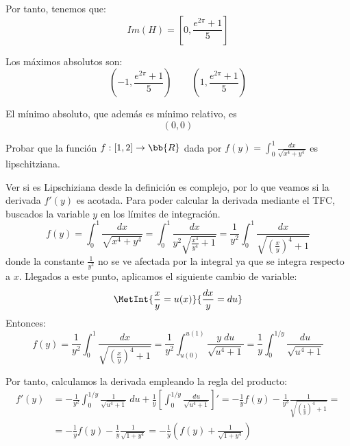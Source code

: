 \begin{ejercicio}
    Por tanto, tenemos que:
    \begin{equation*}
        Im(H) = \left[0,\frac{e^{2\pi} +1}{5}\right]
    \end{equation*}

    Los máximos absolutos son:
    \begin{equation*}
        \left(-1, \frac{e^{2\pi} +1}{5}\right) \qquad \left(1, \frac{e^{2\pi} +1}{5}\right)
    \end{equation*}

    El mínimo absoluto, que además es mínimo relativo, es $$(0,0)$$
\end{ejercicio}

\begin{ejercicio}
    Probar que la función $f:[1,2]\to \bb{R}$ dada por $f(y)=\int_0^1 \frac{dx}{\sqrt{x^4+y^4}}$ es lipschitziana.

    Ver si es Lipschiziana desde la definición es complejo, por lo que veamos si la derivada $f'(y)$ es acotada. Para poder calcular la derivada mediante el TFC, buscados la variable $y$ en los límites de integración.
    \begin{equation*}
        f(y)=
        \int_0^1 \frac{dx}{\sqrt{x^4+y^4}} =
        \int_0^1 \frac{dx}{y^2\sqrt{\frac{x^4}{y^4}+1}} =
        \frac{1}{y^2} \int_0^1 \frac{dx}{\sqrt{\left(\frac{x}{y}\right)^4+1}}
    \end{equation*}
    donde la constante $\frac{1}{y^2}$ no se ve afectada por la integral ya que se integra respecto a $x$. Llegados a este punto, aplicamos el siguiente cambio de variable:
    \begin{equation*}
        \MetInt{\frac{x}{y}=u(x)}{\frac{dx}{y}=du}
    \end{equation*}
    Entonces:
    \begin{equation*}
        f(y)=
        \frac{1}{y^2} \int_0^1 \frac{dx}{\sqrt{\left(\frac{x}{y}\right)^4+1}}
        = \frac{1}{y^2} \int_{u(0)}^{u(1)} \frac{y\;du}{\sqrt{u^4+1}}
        = \frac{1}{y} \int_{0}^{1/y} \frac{du}{\sqrt{u^4+1}}
    \end{equation*}

    Por tanto, calculamos la derivada empleando la regla del producto:
    \begin{equation*}\begin{split}
        f'(y)&=-\frac{1}{y^2} \int_0^{1/y} \frac{1}{\sqrt{u^4+1}}\;du + \frac{1}{y} \left[\int_{0}^{1/y} \frac{du}{\sqrt{u^4+1}}\right]'
        =-\frac{1}{y} f(y) - \frac{1}{y^3} \frac{1}{\sqrt{\left(\frac{1}{y}\right)^4+1}} =
        \\&= -\frac{1}{y} f(y) - \frac{1}{y} \frac{1}{\sqrt{1+y^4}}
        = -\frac{1}{y}\left(f(y)+\frac{1}{\sqrt{1+y^4}}\right)
    \end{split}\end{equation*}


\end{ejercicio}
